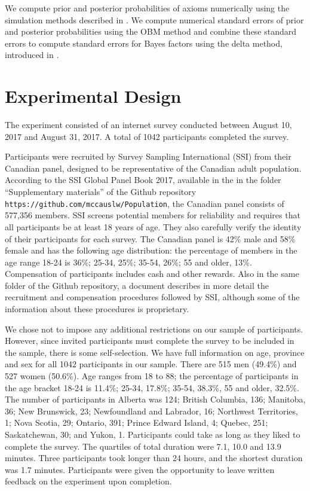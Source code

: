 \documentclass[11pt,letter]{article}
\begin{document}
We compute prior and posterior probabilities of axioms numerically using the simulation methods described in .
We compute numerical standard errors of prior and posterior probabilities using the OBM method and combine these standard errors to compute standard errors for Bayes factors using the delta method, introduced in .

\section{Experimental Design}\label{s:design}

The experiment consisted of an internet survey conducted between August 10, 2017 and August 31, 2017.
A total of 1042 participants completed the survey.

Participants were recruited by Survey Sampling International (SSI) from their Canadian panel, designed to be representative of the Canadian adult population.
According to the SSI Global Panel Book 2017, available in the in the folder ``Supplementary materials'' of the Github repository \texttt{https://github.com/mccauslw/Population}, the Canadian panel consists of 577,356 members.
SSI screens potential members for reliability and requires that all participants be at least 18 years of age.
They also carefully verify the identity of their participants for each survey.
The Canadian panel is 42\% male and 58\% female and has the following age distribution: the percentage of members in the age range 18-24 is 36\%; 25-34, 25\%; 35-54, 26\%; 55 and older, 13\%.
Compensation of participants includes cash and other rewards.
Also in the same folder of the Github repository, a document describes in more detail the recruitment and compensation procedures followed by SSI, although some of the information about these procedures is proprietary.

We chose not to impose any additional restrictions on our sample of participants.
However, since invited participants must complete the survey to be included in the sample, there is some self-selection.
We have full information on age, province and sex for all 1042 participants in our sample.
There are 515 men (49.4\%) and 527 women (50.6\%).
Age ranges from 18 to 88; the percentage of participants in the age bracket 18-24 is 11.4\%; 25-34, 17.8\%; 35-54, 38.3\%, 55 and older, 32.5\%.
The number of participants in Alberta was 124; British Columbia, 136; Manitoba, 36; New Brunswick, 23; Newfoundland and Labrador, 16; Northwest Territories, 1; Nova Scotia, 29; Ontario, 391; Prince Edward Island, 4; Quebec, 251; Saskatchewan, 30; and Yukon, 1.
Participants could take as long as they liked to complete the survey.
The quartiles of total duration were 7.1, 10.0 and 13.9 minutes.
Three participants took longer than 24 hours, and the shortest duration was 1.7 minutes.
Participants were given the opportunity to leave written feedback on the experiment upon completion.
\end{document}
